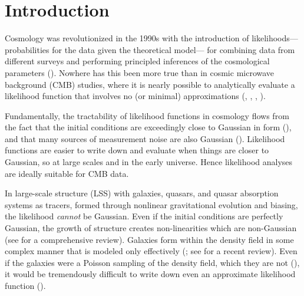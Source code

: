 \documentclass[fleqn,usenatbib]{mnras}
\begin{document}


\section{Introduction}

Cosmology was revolutionized in the 1990s with the introduction of likelihoods---%
pro\-ba\-bil\-ities for the data given the theoretical model---%
for combining data from different surveys and performing principled inferences of
the cosmological parameters (\citealt{White:1996aa, Riess:1998aa}). 
Nowhere has this been more true than in cosmic microwave background (CMB) studies,
where it is nearly possible to analytically evaluate a likelihood function that
involves no (or minimal) approximations (\citealt{Oh:1999aa}, \citealt{Wandelt:2004aa},  
\citealt{Eriksen:2004aa}, \citealt{planckI, planckII}). 

Fundamentally, the tractability of likelihood functions in cosmology flows from
the fact that the initial conditions are exceedingly close to Gaussian in form 
(\citealt{planck_NG, planck_inflation}),
and that many sources of measurement noise are also Gaussian (\citealt{Knox:1995aa, Leach:2008aa}).
Likelihood functions are easier to write down and evaluate when things are closer 
to Gaussian, so at large scales and in the early universe. Hence likelihood analyses 
are ideally suitable for CMB data. 

In large-scale structure (LSS) with galaxies, quasars, and quasar absorption systems as tracers,
formed through nonlinear gravitational evolution and biasing, the likelihood {\em cannot} be Gaussian. 
Even if the initial conditions are perfectly Gaussian, the growth of structure creates non-linearities 
which are non-Gaussian (see \citealt{Bernardeau:2002aa} for a comprehensive review). 
Galaxies form within the density field in some complex manner that is modeled only effectively
(\citealt{Dressler:1980aa, Kaiser:1984aa, Santiago:1992aa, Steidel:1998aa}; see \citealt{somerville15} for a recent review).  
Even if the galaxies were a Poisson sampling of the density field, which they are not (\citealt{Mo:1996aa, Sommerville:2001aa, Casas-Miranda:2002aa}), it would be tremendously difficult to write down even 
an approximate likelihood function (\citealt{devpois}).
\end{document}
